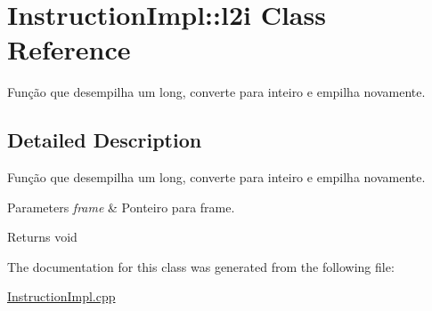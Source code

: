 \hypertarget{class_instruction_impl_1_1l2i}{}\section{Instruction\+Impl\+:\+:l2i Class Reference}
\label{class_instruction_impl_1_1l2i}


Função que desempilha um long, converte para inteiro e empilha novamente.  




\subsection{Detailed Description}
Função que desempilha um long, converte para inteiro e empilha novamente. 


\begin{DoxyParams}{Parameters}
{\em frame} & Ponteiro para frame. \\
\hline
\end{DoxyParams}
\begin{DoxyReturn}{Returns}
void 
\end{DoxyReturn}


The documentation for this class was generated from the following file\+:\begin{DoxyCompactItemize}
\item 
\hyperlink{_instruction_impl_8cpp}{Instruction\+Impl.\+cpp}\end{DoxyCompactItemize}
